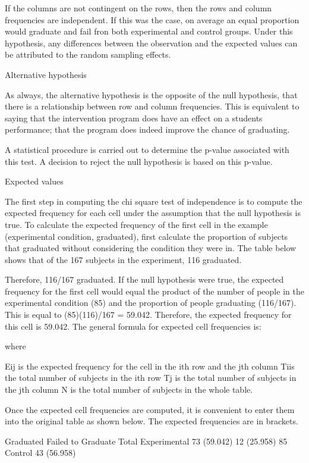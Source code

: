 \begin{frame}
If the columns are not contingent on the rows, then the rows and column frequencies are independent. If this was the case, on average an equal proportion would graduate and fail fron both experimental and control groups. Under this hypothesis, any differences between the observation and the expected values can be attributed to the random sampling effects.
 
Alternative hypothesis
 
As always, the alternative hypothesis is the opposite of the null hypothesis, that there is a relationship between row and column frequencies.
This is equivalent to saying that the intervention program does have an effect on a students performance; that the program does indeed improve the chance of graduating. 
 
A statistical procedure is carried out to determine the p-value associated with this test. A decision to reject the null hypothesis is based on this p-value.
 
Expected values
 
The first step in computing the chi square test of independence is to compute the expected frequency for each cell under the assumption that the null hypothesis is true. To calculate the expected frequency of the first cell in the example (experimental condition, graduated), first calculate the proportion of subjects that graduated without considering the condition they were in. The table below shows that of the 167 subjects in the experiment, 116 graduated.
 
Therefore, 116/167 graduated. If the null hypothesis were true, the expected frequency for the first cell would equal the product of the number of people in the experimental condition (85) and the proportion of people graduating (116/167). This is equal to (85)(116)/167 = 59.042. Therefore, the expected frequency for this cell is 59.042. The general formula for expected cell frequencies is:
 
  
where
 
Eij is the expected frequency for the cell in the ith row and the jth column
Tiis the total number of subjects in the ith row
Tj is the total number of subjects in the jth column
N is the total number of subjects in the whole table. 

 
Once the expected cell frequencies are computed, it is convenient to enter them into the original table as shown below. The expected frequencies are in brackets. 
 
 
 
Graduated
Failed to
Graduate
Total
Experimental
73
(59.042)
12
(25.958)
85
Control
43
(56.958)
 

\end{frame}
